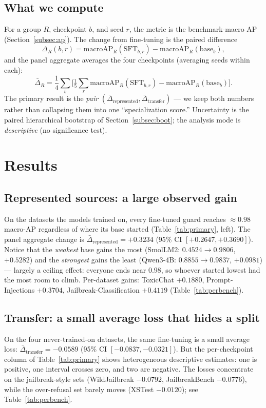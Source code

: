 \documentclass[11pt]{article}
\begin{document}
\subsection{What we compute}
For a group $R$, checkpoint $b$, and seed $r$, the metric is the benchmark-macro AP
(Section~\ref{subsec:ap}). The change from fine-tuning is the paired difference
\[
\Delta_R(b,r) = \text{macroAP}_R(\text{SFT}_{b,r}) - \text{macroAP}_R(\text{base}_b),
\]
and the panel aggregate averages the four checkpoints (averaging seeds within each):
\[
\bar\Delta_R = \frac{1}{4}\sum_b\Big[\tfrac{1}{5}\sum_r \text{macroAP}_R(\text{SFT}_{b,r}) -
\text{macroAP}_R(\text{base}_b)\Big].
\]
The primary result is the \emph{pair}
$(\bar\Delta_{\text{represented}}, \bar\Delta_{\text{transfer}})$ --- we keep both numbers
rather than collapsing them into one ``specialization score.'' Uncertainty is the paired
hierarchical bootstrap of Section~\ref{subsec:boot}; the analysis mode is
\emph{descriptive} (no significance test).

\section{Results}

\subsection{Represented sources: a large observed gain}
On the datasets the models trained on, every fine-tuned guard reaches ${\approx}0.98$
macro-AP regardless of where its base started (Table~\ref{tab:primary}, left). The panel
aggregate change is $\bar\Delta_{\text{represented}} = \mathbf{+0.3234}$ (95\% CI
$[+0.2647, +0.3690]$). Notice that the \emph{weakest} base gains the most (SmolLM2:
$0.4524\!\to\!0.9806$, $+0.5282$) and the \emph{strongest} gains the least (Qwen3-4B:
$0.8855\!\to\!0.9837$, $+0.0981$) --- largely a ceiling effect: everyone ends near 0.98, so
whoever started lowest had the most room to climb. Per-dataset gains: ToxicChat $+0.1880$,
Prompt-Injections $+0.3704$, Jailbreak-Classification $+0.4119$ (Table~\ref{tab:perbench}).

\subsection{Transfer: a small average loss that hides a split}
On the four never-trained-on datasets, the same fine-tuning is a small average loss:
$\bar\Delta_{\text{transfer}} = \mathbf{-0.0589}$ (95\% CI $[-0.0837, -0.0321]$). But the
per-checkpoint column of Table~\ref{tab:primary} shows heterogeneous descriptive estimates:
one is positive, one interval crosses zero, and two are negative. The losses concentrate on the
jailbreak-style sets (WildJailbreak $-0.0792$, JailbreakBench $-0.0776$), while the
over-refusal set barely moves (XSTest $-0.0120$); see Table~\ref{tab:perbench}.
\end{document}
